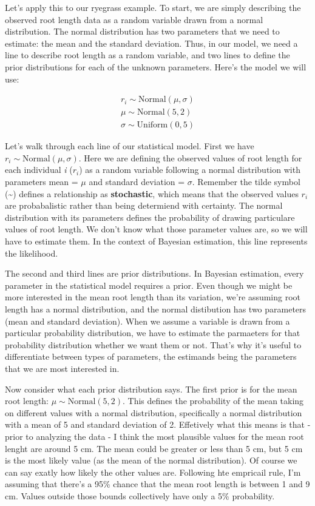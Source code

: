 \documentclass[
]{book}
\begin{document}
Let's apply this to our ryegrass example. To start, we are simply describing the observed root length data as a random variable drawn from a normal distribution. The normal distribution has two parameters that we need to estimate: the mean and the standard deviation. Thus, in our model, we need a line to describe root length as a random variable, and two lines to define the prior distributions for each of the unknown parameters. Here's the model we will use:

\[
\begin{array}{l}
r_i \sim \mathrm{Normal}(\mu, \sigma) \\
\mu \sim \mathrm{Normal}(5, 2) \\
\sigma \sim \mathrm{Uniform}(0, 5)
\end{array}
\]

Let's walk through each line of our statistical model. First we have \(r_i \sim \mathrm{Normal}(\mu, \sigma)\). Here we are defining the observed values of root length for each individual \emph{i} (\(r_i\)) as a random variable following a normal distribution with parameters mean = \(\mu\) and standard deviation = \(\sigma\). Remember the tilde symbol (\textasciitilde) defines a relationship as \textbf{stochastic}, which means that the observed values \(r_i\) are probabalistic rather than being determiend with certainty. The normal distribution with its parameters defines the probability of drawing particulare values of root length. We don't know what those parameter values are, so we will have to estimate them. In the context of Bayesian estimation, this line represents the likelihood.

The second and third lines are prior distributions. In Bayesian estimation, every parameter in the statistical model requires a prior. Even though we might be more interested in the mean root length than its variation, we're assuming root length has a normal distribution, and the normal distibution has two parameters (mean and standard deviation). When we assume a variable is drawn from a particular probability distribution, we have to estimate the parmaeters for that probability distribution whether we want them or not. That's why it's useful to differentiate between types of parameters, the estimands being the parameters that we are most interested in.

Now consider what each prior distribution says. The first prior is for the mean root length: \(\mu \sim \mathrm{Normal}(5, 2)\). This defines the probability of the mean taking on different values with a normal distribution, specifically a normal distribution with a mean of 5 and standard deviation of 2. Effetively what this means is that - prior to analyzing the data - I think the most plausible values for the mean root lenght are around 5 cm. The mean could be greater or less than 5 cm, but 5 cm is the most likely value (as the mean of the normal distribution). Of course we can say exatly how likely the other values are. Following hte empricail rule, I'm assuming that there's a 95\% chance that the mean root length is between 1 and 9 cm. Values outside those bounds collectively have only a 5\% probability.
\end{document}
